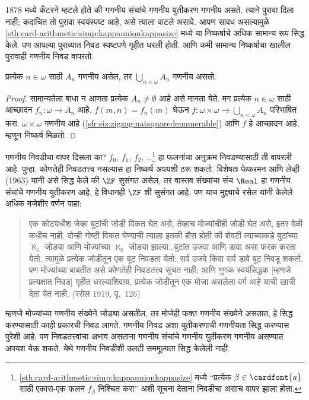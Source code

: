\begin{ex}
1878 मध्ये कँटरने म्हटले होते की गणनीय संचांचे गणनीय युतीकरण गणनीय असते. त्याने पुरावा दिला नाही; कदाचित तो पुरावा स्वयंस्पष्ट आहे, असे त्याला वाटले असावे. आपण सावध असल्यामुळे \ref{sth:card-arithmetic:simp:kappaunionkappasize} मध्ये या निष्कर्षाचे अधिक सामान्य रूप सिद्ध केले. पण आपल्या पुराव्यात निवड स्पष्टपणे गृहीत धरली होती. आणि कमी सामान्य निष्कर्षाचा खालील पुरावाही गणनीय निवड वापरतो.

\begin{thm}
प्रत्येक $n \in \omega$ साठी $A_n$ गणनीय असेल, तर $\bigcup_{n <
\omega} A_n$ गणनीय असतो.
\end{thm}

\begin{proof}
सामान्यतेला बाधा न आणता प्रत्येक $A_n \neq \emptyset$ आहे असे मानता येते. मग प्रत्येक $n \in \omega$ साठी आच्छादन $f_n \colon \omega
\to A_n$ आहे. $f(m, n) = f_n(m)$ घेऊन $f \colon \omega \times \omega \to \bigcup_{n <
\omega} A_n$ परिभाषित करा. $\omega
\times \omega$ गणनीय आहे (\ref{sfr:siz:zigzag:natsquaredenumerable}) आणि $f$ हे आच्छादन आहे, म्हणून निष्कर्ष मिळतो.
\end{proof}
\noindent
गणनीय निवडीचा वापर दिसला का? $f_0$, $f_1$, $f_2$, \dots\footnote{\ref{sth:card-arithmetic:simp:kappaunionkappasize} मध्ये “प्रत्येक $\beta \in \cardfont{a}$ साठी एकास-एक फलन $f_\beta$ निश्चित करा” अशी सूचना देताना निवडीचा असाच वापर झाला होता.} हा फलनांचा अनुक्रम निवडण्यासाठी ती वापरली आहे. पुन्हा, कोणतेही निवडतत्त्व नसल्यास हा निष्कर्ष अपयशी ठरू शकतो. विशेषतः फेफरमन आणि लेव्ही (1963) यांनी असे सिद्ध केले की $\ZF$ सुसंगत असेल, तर वास्तव संख्यांचा संच $\Real$ हा गणनीय संचांचे गणनीय युतीकरण आहे, हे विधानही $\ZF$ शी सुसंगत आहे. पण याच मुद्द्याचे रसेल यांनी केलेले अधिक मजेशीर वर्णन पाहा:
\begin{quote}
  एक कोट्यधीश जेव्हा बुटांची जोडी विकत घेत असे, तेव्हाच मोज्यांचीही जोडी घेत असे, इतर वेळी कधीच नाही. दोन्ही गोष्टी विकत घेण्याची त्याला इतकी हौस होती की शेवटी त्याच्याकडे बुटांच्या $\aleph_0$ जोड्या आणि मोज्यांच्या $\aleph_0$ जोड्या झाल्या\dots\@ बुटांत उजवा आणि डावा असा फरक करता येतो. त्यामुळे प्रत्येक जोडीतून एक बूट निवडता येतो: सर्व उजवे किंवा सर्व डावे बूट निवडू शकतो. पण मोज्यांच्या बाबतीत असे कोणतेही निवडतत्त्व सुचत नाही; आणि गुणक स्वयंसिद्धक [म्हणजे प्रत्यक्षात निवड] गृहीत धरल्याशिवाय, प्रत्येक जोडीतून एक मोजा असलेला वर्ग आहे याची खात्री देता येत नाही.
  (रसेल 1919, पृ.~126)
\end{quote}
म्हणजे मोज्यांच्या गणनीय संख्येने जोड्या असतील, तर मोजेही फक्त गणनीय संख्येने असतात, हे सिद्ध करण्यासाठी काही प्रकारची निवड लागते. गणनीय निवड अशा युतीकरणाची गणनीयता सिद्ध करण्यास पुरेशी आहे; पण निवडतत्त्वांचा अभाव असताना गणनीय संचांचे गणनीय युतीकरण गणनीय असण्यात अपयश येऊ शकते. येथे गणनीय निवडीशी उलटी सममूल्यता सिद्ध केलेली नाही.
\end{ex}

